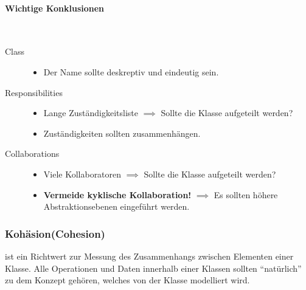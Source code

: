 \documentclass[ngerman,color=3b]{tuda_summary}
\begin{document}

\paragraph{Wichtige Konklusionen}\mbox{}\\
\begin{description}
    \item[Class]
          \begin{itemize}
              \item Der Name sollte deskreptiv und eindeutig sein.
          \end{itemize}
    \item[Responsibilities]
          \begin{itemize}
              \item Lange Zuständigkeitsliste  $ \implies $ Sollte die Klasse aufgeteilt werden?
              \item Zuständigkeiten sollten zusammenhängen.
          \end{itemize}
    \item[Collaborations]
          \begin{itemize}
              \item Viele Kollaboratoren $ \implies $ Sollte die Klasse aufgeteilt werden?
              \item \textbf{Vermeide kyklische Kollaboration!} $ \implies $ Es sollten höhere Abstraktionsebenen eingeführt werden.
          \end{itemize}
\end{description}

\subsubsection{Kohäsion(Cohesion)}
\begin{definition}[Kohäsion]
    ist ein Richtwert zur Messung des Zusammenhangs zwischen Elementen einer Klasse. Alle Operationen und Daten innerhalb einer Klassen sollten \enquote{natürlich} zu dem Konzept gehören, welches von der Klasse modelliert wird.
\end{definition}
\end{document}

